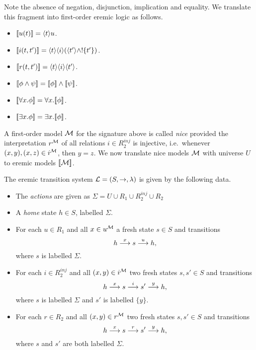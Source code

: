 \NI Note the absence of negation, disjunction, implication and
equality. We translate this fragment into first-order eremic logic as
follows.
\begin{itemize}

\item $\lbrack\!\lbrack u(t) \rbrack\!\rbrack = \langle t \rangle u$.

\item $\lbrack\!\lbrack i(t, t') \rbrack\!\rbrack = \langle t \rangle \langle i \rangle (\langle t' \rangle \land !\{t'\})$.

\item $\lbrack\!\lbrack r(t, t') \rbrack\!\rbrack = \langle t \rangle \langle i \rangle \langle t' \rangle$.

\item $\lbrack\!\lbrack \phi \land \psi \rbrack\!\rbrack = \lbrack\!\lbrack \phi \rbrack\!\rbrack \land \lbrack\!\lbrack \psi \rbrack\!\rbrack$.

\item $\lbrack\!\lbrack \forall x.\phi \rbrack\!\rbrack = \forall x.\lbrack\!\lbrack \phi \rbrack\!\rbrack$.

\item $\lbrack\!\lbrack \exists x.\phi \rbrack\!\rbrack = \exists x.\lbrack\!\lbrack \phi \rbrack\!\rbrack$.

\end{itemize}

\NI A first-order model $\mathcal{M}$ for the signature above is called
\emph{nice} provided the interpretation $r^{\mathcal{M}}$ of all relations
$i \in R_2^{inj}$ is injective, i.e.~whenever $(x, y), (x, z) \in
i^{\mathcal{M}}$, then $y = z$. We now translate nice models $\mathcal{M}$
with universe $U$ to eremic models $\lbrack\!\lbrack \mathcal{M} \rbrack\!\rbrack$.

The eremic transition system $\mathcal{L} = (S, \rightarrow, \lambda)$ is given by
the following data.
\begin{itemize}

\item The \emph{actions} are given as $\Sigma = U \cup R_1 \cup
  R_2^{inj} \cup R_2$

\item A \emph{home} state $h \in S$, labelled $\Sigma$.

\item For each $u \in R_1$ and all $x \in u^{\mathcal{M}}$ a fresh state
  $s \in S$ and transitions
\[
   h \stackrel{x}{\longrightarrow} s \stackrel{u}{\longrightarrow} h,
\]
where $s$ is labelled $\Sigma$.

\item For each $i \in R_2^{inj}$ and all $(x, y)  \in
i^{\mathcal{M}}$ two fresh states $s, s' \in S$ and transitions
\[
   h \stackrel{x}{\longrightarrow} s \stackrel{i}{\longrightarrow} s' \stackrel{y}{\longrightarrow} h,
\]
where $s$ is labelled $\Sigma$ and $s'$ is labelled $\{y\}$.

\item For each $r \in R_2$ and all $(x, y)  \in                                                                         
r^{\mathcal{M}}$ two fresh states $s, s' \in S$ and transitions
\[
   h \stackrel{x}{\longrightarrow} s \stackrel{r}{\longrightarrow} s' \stackrel{y}{\longrightarrow} h,
\]
where $s$ and $s'$ are both labelled $\Sigma$.

\end{itemize}


